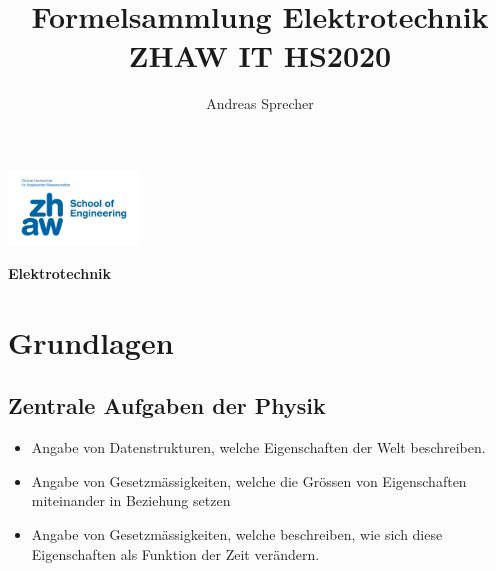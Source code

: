 \documentclass[8pt,a4paper]{scrartcl}
\title{Formelsammlung Elektrotechnik ZHAW IT HS2020}
\author{Andreas Sprecher}
\renewcommand{\emph}[1]{\textbf{#1}}                                                            %
\begin{document}
\begin{multicols*}{3}
\setlength{\columnseprule}{0.4pt}
    \parbox{4cm}{
        \includegraphics[height=2cm]{./img/Logo.jpeg}
    }
    \parbox{4cm}{
        \emph{\Large{Elektrotechnik}}
    }
    \vspace{-2mm} 

    \section{Grundlagen}
		\subsection{Zentrale Aufgaben der Physik}    
    			\begin{itemize}\itemsep0pt				
				\item Angabe von Datenstrukturen, welche Eigenschaften der Welt beschreiben.
				\item Angabe von Gesetzmässigkeiten, welche die Grössen von Eigenschaften miteinander in Beziehung setzen
				\item Angabe von Gesetzmässigkeiten, welche beschreiben, wie sich diese Eigenschaften als Funktion der Zeit verändern.
			\end{itemize}
    

\end{multicols*}
\end{document}
